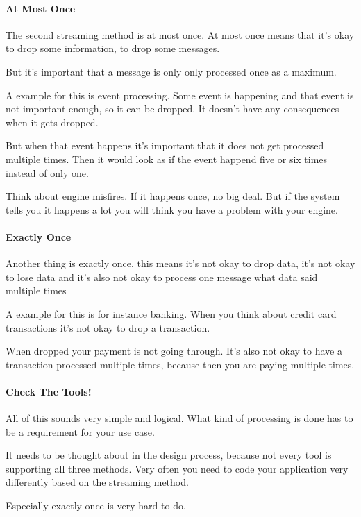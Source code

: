 \documentclass[12pt]{scrartcl} %
\begin{document}
\paragraph{At Most Once}

The second streaming method is at most once. At most once means that it’s okay to drop some information, to drop some messages.

But it’s important that a message is only only processed once as a maximum.

A example for this is event processing. Some event is happening and that event is not important enough, so it can be dropped. It doesn’t have any consequences when it gets dropped.

But when that event happens it’s important that it does not get processed multiple times. Then it would look as if the event happend five or six times instead of only one.

Think about engine misfires. If it happens once, no big deal. But if the system tells you it happens a lot you will think you have a problem with your engine.

\paragraph{Exactly Once}

Another thing is exactly once, this means it’s not okay to drop data, it’s not okay to lose data and it’s also not okay to process one message what data said multiple times

A example for this is for instance banking. When you think about credit card transactions it’s not okay to drop a transaction.

When dropped your payment is not going through. It’s also not okay to have a transaction processed multiple times, because then you are paying multiple times.

\paragraph{Check The Tools!}

All of this sounds very simple and logical. What kind of processing is done has to be a requirement for your use case.

It needs to be thought about in the design process, because not every tool is supporting all three methods. Very often you need to code your application very differently based on the streaming method.

Especially exactly once is very hard to do.
\end{document}
